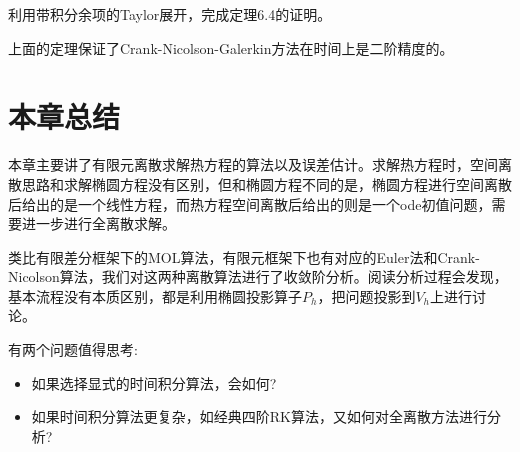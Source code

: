 \begin{exercise}
    利用带积分余项的Taylor展开，完成定理6.4的证明。
\end{exercise}
\begin{remark}
    上面的定理保证了Crank-Nicolson-Galerkin方法在时间上是二阶精度的。
\end{remark}
\section{本章总结}
本章主要讲了有限元离散求解热方程的算法以及误差估计。求解热方程时，空间离散思路和求解椭圆方程没有区别，但和椭圆方程不同的是，椭圆方程进行空间离散后给出的是一个线性方程，而热方程空间离散后给出的则是一个ode初值问题，需要进一步进行全离散求解。

类比有限差分框架下的MOL算法，有限元框架下也有对应的Euler法和Crank-Nicolson算法，我们对这两种离散算法进行了收敛阶分析。阅读分析过程会发现，基本流程没有本质区别，都是利用椭圆投影算子$P_{h}$，把问题投影到$V_{h}$上进行讨论。

有两个问题值得思考:
\begin{itemize}
    \item 如果选择显式的时间积分算法，会如何?
    \item 如果时间积分算法更复杂，如经典四阶RK算法，又如何对全离散方法进行分析?
\end{itemize}